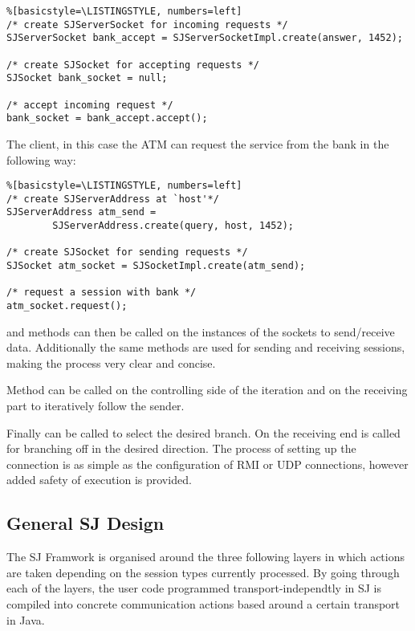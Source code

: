 \begin{lstlisting}%[basicstyle=\LISTINGSTYLE, numbers=left]
/* create SJServerSocket for incoming requests */
SJServerSocket bank_accept = SJServerSocketImpl.create(answer, 1452);

/* create SJSocket for accepting requests */
SJSocket bank_socket = null;

/* accept incoming request */
bank_socket = bank_accept.accept();
\end{lstlisting}

The client, in this case the ATM can request the service from the bank in the following way:

\begin{lstlisting}%[basicstyle=\LISTINGSTYLE, numbers=left]
/* create SJServerAddress at `host'*/
SJServerAddress atm_send =
        SJServerAddress.create(query, host, 1452);

/* create SJSocket for sending requests */
SJSocket atm_socket = SJSocketImpl.create(atm_send);

/* request a session with bank */
atm_socket.request();
\end{lstlisting}

 and  methods can then be called on the instances of the sockets to send/receive data. Additionally the same methods are used for sending and receiving sessions, making the process very clear and concise.

Method  can be called on the controlling side of the iteration and  on the receiving part to iteratively follow the sender.

Finally  can be called to select the desired branch. On the receiving end 
 is called for branching off in the desired direction. The process of setting up the connection is as simple as the configuration of RMI or UDP connections, however added safety of execution is provided.

\subsection{General SJ Design}
\label{subsec:sjdesign}

The SJ Framwork is organised around the three following layers in which actions are taken depending on the session types currently processed. By going through each of the layers, the user code programmed transport-independtly in SJ is compiled into concrete communication actions based around a certain transport in Java.

